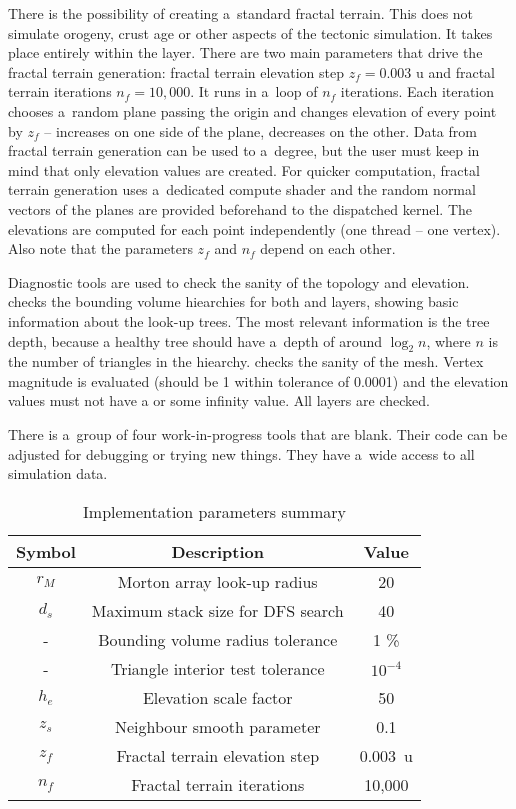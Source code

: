 There is the possibility of creating a~standard fractal terrain. This does not simulate orogeny, crust age or other aspects of the tectonic simulation. It takes place entirely within the  layer. There are two main parameters that drive the fractal terrain generation: fractal terrain elevation step $z_f=0.003\mbox{ u}$ and fractal terrain iterations $n_f=10,000$. It runs in a~loop of $n_f$ iterations.  Each iteration chooses a~random plane passing the origin and changes elevation of every  point by $z_f$ -- increases on one side of the plane, decreases on the other. Data from fractal terrain generation can be used to a~degree, but the user must keep in mind that only elevation values are created. For quicker computation, fractal terrain generation uses a~dedicated compute shader and the random normal vectors of the planes are provided beforehand to the dispatched kernel. The elevations are computed for each point independently (one thread -- one vertex). Also note that the parameters $z_f$ and $n_f$ depend on each other.

Diagnostic tools are used to check the sanity of the topology and elevation.  checks the bounding volume hiearchies for both  and  layers, showing basic information about the look-up trees. The most relevant information is the tree depth, because a healthy tree should have a~depth of around $\log_2n$, where $n$ is the number of triangles in the hiearchy.  checks the sanity of the mesh. Vertex magnitude is evaluated (should be 1 within tolerance of 0.0001) and the elevation values must not have a  or some infinity value. All layers are checked.

There is a~group of four work-in-progress tools that are blank. Their code can be adjusted for debugging or trying new things. They have a~wide access to all simulation data.
\begin{table}[h]
\centering
\begin{tabular}{ccc}
\textbf{Symbol}&\textbf{Description}&\textbf{Value}\\
\hline
$r_M$&Morton array look-up radius&20\\
$d_s$&Maximum stack size for DFS search&40\\
-&Bounding volume radius tolerance&1 \%\\
-&Triangle interior test tolerance&$10^{-4}$\\
$h_e$&Elevation scale factor&50\\
$z_s$&Neighbour smooth parameter&0.1\\
$z_f$&Fractal terrain elevation step&0.003\mbox{ u}\\
$n_f$&Fractal terrain iterations&10,000\\
\end{tabular}
\caption{Implementation parameters summary}
\label{tab:implementation-parameters-summary}
\end{table}